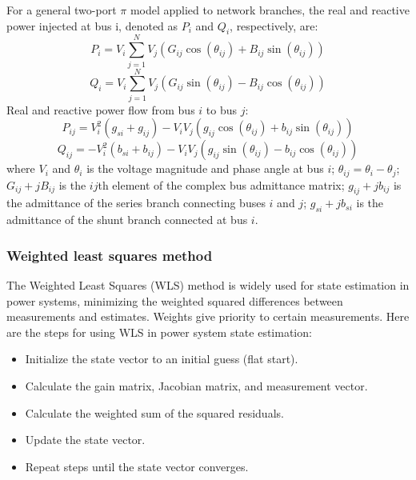 For a general two-port $\pi$ model applied to network branches, the real and reactive power injected at bus i, denoted as $P_i$ and $Q_i$, respectively, are:
\begin{equation}
    P_{i}=V_{i} \sum_{j=1}^{N} V_{j}\left(G_{i j} \cos \left(\theta_{i j}\right)+B_{i j} \sin \left(\theta_{i j}\right)\right)
\end{equation}
\begin{equation}
    Q_{i}=V_{i} \sum_{j=1}^{N} V_{j}\left(G_{i j} \sin \left(\theta_{i j}\right)-B_{i j} \cos \left(\theta_{i j}\right)\right)
\end{equation}
Real and reactive power flow from bus $i$ to bus $j$:
\begin{equation}
    P_{i j}=V_{i}^{2}\left(g_{s i}+g_{i j}\right)-V_{i} V_{j}\left(g_{i j} \cos \left(\theta_{i j}\right)+b_{i j} \sin \left(\theta_{i j}\right)\right)
\end{equation}
\begin{equation}
    Q_{i j}=-V_{i}^{2}\left(b_{s i}+b_{i j}\right)-V_{i} V_{j}\left(g_{i j} \sin \left(\theta_{i j}\right)-b_{i j} \cos \left(\theta_{i j}\right)\right)
\end{equation}
where $V_i$ and $\theta_i$ is the voltage magnitude and phase angle at bus $i$; \(\theta_{ij} = \theta_i-\theta_j\);  \(G_{ij}+jB_{ij}\) is the $ij$th element of the complex bus admittance matrix; \(g_{ij}+jb_{ij}\) is the admittance of the series branch connecting buses $i$ and $j$; \(g_{si}+jb_{si}\) is the admittance of the shunt branch connected at bus $i$.

\subsubsection{Weighted least squares method}

The Weighted Least Squares (WLS) method is widely used for state estimation in power systems, minimizing the weighted squared differences between measurements and estimates. Weights give priority to certain measurements. Here are the steps for using WLS in power system state estimation:
\begin{itemize}
    \item Initialize the state vector to an initial guess (flat start).
    \item Calculate the gain matrix, Jacobian matrix, and measurement vector.
    \item Calculate the weighted sum of the squared residuals.
    \item Update the state vector.
    \item Repeat steps until the state vector converges.
\end{itemize}

